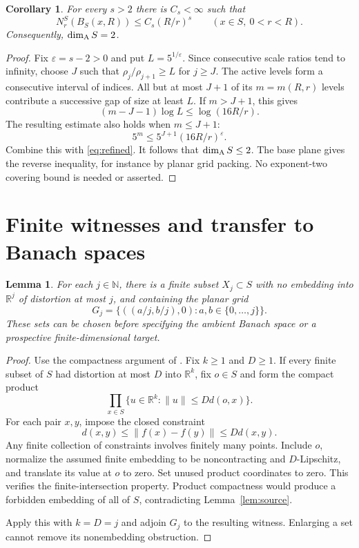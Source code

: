 \documentclass[
  11pt,
]{article}
\newtheorem{lemma}[theorem]{Lemma}
\newtheorem{corollary}[theorem]{Corollary}
\theoremstyle{remark}\newtheorem{remark}[theorem]{Remark}
\newcommand{\R}{\mathbb R}\newcommand{\N}{\mathbb N}\newcommand{\Z}{\mathbb Z}
\newcommand{\norm}[1]{\lVert#1\rVert}\newcommand{\ip}[2]{\langle#1,#2\rangle}
\begin{document}
\begin{corollary}\label{cor:assouad-source}
For every $s>2$ there is $C_s<\infty$ such that
\begin{equation}\label{eq:s-source}
 N_r^S(B_S(x,R))\le C_s(R/r)^s\qquad(x\in S,\ 0<r<R).
\end{equation}
Consequently, $\dim_{\mathrm A} S=2$.
\end{corollary}
\begin{proof}
Fix $\varepsilon=s-2>0$ and put $L=5^{1/\varepsilon}$. Since consecutive scale ratios tend to infinity, choose $J$ such that $\rho_j/\rho_{j+1}\ge L$ for $j\ge J$. The active levels form a consecutive interval of indices. All but at most $J+1$ of its $m=m(R,r)$ levels contribute a successive gap of size at least $L$. If $m>J+1$, this gives
\[
 (m-J-1)\log L\le\log(16R/r).
\]
The resulting estimate also holds when $m\le J+1$:
\[
 5^m\le5^{J+1}(16R/r)^\varepsilon.
\]
Combine this with \eqref{eq:refined}. It follows that $\dim_{\mathrm A} S\le2$. The base plane gives the reverse inequality, for instance by planar grid packing. No exponent-two covering bound is needed or asserted.
\end{proof}

\section{Finite witnesses and transfer to Banach spaces}\label{sec:witnesses}
\begin{lemma}\label{lem:witnesses}
For each $j\in\N$, there is a finite subset $X_j\subset S$ with no embedding into $\R^j$ of distortion at most $j$, and containing the planar grid
\begin{equation}\label{eq:grid}
 G_j=\{((a/j,b/j),0):a,b\in\{0,\ldots,j\}\}.
\end{equation}
These sets can be chosen before specifying the ambient Banach space or a prospective finite-dimensional target.
\end{lemma}
\begin{proof}
Use the compactness argument of \cite[Section 7]{OpenAI}. Fix $k\ge1$ and $D\ge1$. If every finite subset of $S$ had distortion at most $D$ into $\R^k$, fix $o\in S$ and form the compact product
\[
 \prod_{x\in S}\{u\in\R^k:\norm u\le Dd(o,x)\}.
\]
For each pair $x,y$, impose the closed constraint
\[
 d(x,y)\le\norm{f(x)-f(y)}\le Dd(x,y).
\]
Any finite collection of constraints involves finitely many points. Include $o$, normalize the assumed finite embedding to be noncontracting and $D$-Lipschitz, and translate its value at $o$ to zero. Set unused product coordinates to zero. This verifies the finite-intersection property. Product compactness would produce a forbidden embedding of all of $S$, contradicting Lemma~\ref{lem:source}.

Apply this with $k=D=j$ and adjoin $G_j$ to the resulting witness. Enlarging a set cannot remove its nonembedding obstruction.
\end{proof}
\end{document}
